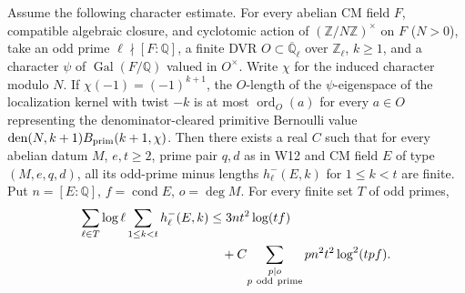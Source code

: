 
\begin{formalstatement}\label{sub:W14}
Assume the following character estimate. For every abelian CM field
$F$, compatible algebraic closure, and cyclotomic action of
$(\mathbb Z/N\mathbb Z)^\times$ on $F$ ($N>0$), take an odd prime
$\ell\nmid[F:\mathbb Q]$, a finite DVR
$O\subset\overline{\mathbb Q}_\ell$ over $\mathbb Z_\ell$, $k\ge1$,
and a character $\psi$ of $\operatorname{Gal}(F/\mathbb Q)$ valued in
$O^\times$. Write $\chi$ for the induced character modulo $N$.
If $\chi(-1)=(-1)^{k+1}$, the $O$-length of the $\psi$-eigenspace
of the localization kernel with twist $-k$ is at most
$\operatorname{ord}_O(a)$ for every $a\in O$ representing the
denominator-cleared primitive Bernoulli value
$\operatorname{den}(N,k+1)B_{\rm prim}(k+1,\chi)$.
Then there exists a real $C$ such that for every abelian datum $M$,
$e,t\ge2$, prime pair $q,d$ as in W12 and CM field $E$ of type
$(M,e,q,d)$, all its odd-prime minus lengths $h_\ell^-(E,k)$ for
$1\le k<t$ are finite. Put $n=[E:\mathbb Q]$, $f=\operatorname{cond}E$,
$o=\deg M$. For every finite set $T$ of odd primes,
\[
\begin{split}
 \sum_{\ell\in T}\log\ell\sum_{1\le k<t}h_\ell^-(E,k)
 &\le 3nt^2\log(tf)\\
 &\quad+C\!\sum_{\substack{p\mid o\\p\ {\rm odd\ prime}}}
                  pn^2t^2\log^2(tpf).
\end{split}
\]
\end{formalstatement}
